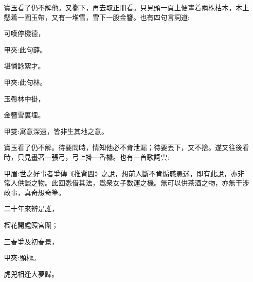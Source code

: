 \begin{parag}
    寶玉看了仍不解他。又擲下，再去取正冊看。只見頭一頁上便畫着兩株枯木，木上懸着一圍玉帶，又有一堆雪，雪下一股金簪。也有四句言詞道:
\end{parag}


\begin{poem}
    \begin{pl}可嘆停機德，\end{pl}\begin{note}甲夾:此句薛。\end{note}

    \begin{pl}堪憐詠絮才。\end{pl}\begin{note}甲夾:此句林。\end{note}

    \begin{pl}玉帶林中掛，\end{pl}

    \begin{pl}金簪雪裏埋。\end{pl}\begin{note}甲雙:寓意深遠，皆非生其地之意。\end{note}

\end{poem}


\begin{parag}
    寶玉看了仍不解。待要問時，情知他必不肯泄漏；待要丟下，又不捨。遂又往後看時，只見畫著一張弓，弓上掛一香櫞。也有一首歌詞雲:\begin{note}甲眉:世之好事者爭傳《推背圖》之說，想前人斷不肯煽惑愚迷，即有此說，亦非常人供談之物。此回悉借其法，爲衆女子數運之機。無可以供茶酒之物，亦無干涉政事，真奇想奇筆。\end{note}
\end{parag}


\begin{poem}
    \begin{pl}二十年來辨是誰，\end{pl}

    \begin{pl}榴花開處照宮闈；\end{pl}

    \begin{pl}三春爭及初春景，\end{pl}\begin{note}甲夾:顯極。\end{note}

    \begin{pl}虎兕相逢大夢歸。\end{pl}
\end{poem}


